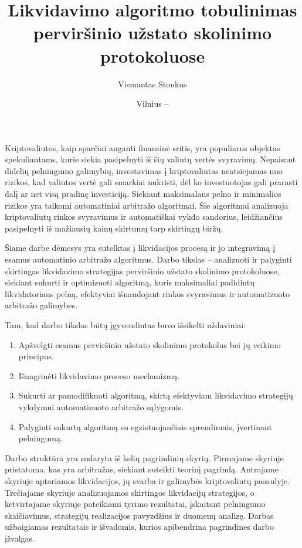 \documentclass{VUMIFPSkursinis}
\title{Likvidavimo algoritmo tobulinimas perviršinio užstato skolinimo protokoluose}
\author{Vismantas Stonkus}
\date{Vilnius – \the\year}
\begin{document}
\maketitle

\tableofcontents


Kriptovaliutos, kaip sparčiai auganti finansinė sritis, yra populiarus objektas spekuliantams, kurie siekia pasipelnyti iš šių valiutų vertės svyravimų. Nepaisant didelių pelningumo galimybių, investavimas į kriptovaliutas neatsiejamas nuo rizikos, kad valiutos vertė gali smarkiai nukristi, dėl ko investuotojas gali prarasti dalį ar net visą pradinę investiciją. Siekiant maksimalaus pelno ir minimalios rizikos yra taikomi automatiniai arbitražo algoritmai. Šie algoritmai analizuoja kriptovaliutų rinkos svyravimus ir automatiškai vykdo sandorius, leidžiančius pasipelnyti iš mažiausių kainų skirtumų tarp skirtingų biržų.

Šiame darbe dėmesys yra sutelktas į likvidacijos procesą ir jo integravimą į esamus automatinio arbitražo algoritmus. Darbo tikslas – analizuoti ir palyginti skirtingas likvidavimo strategijas perviršinio užstato skolinimo protokoluose, siekiant sukurti ir optimizuoti algoritmą, kuris maksimaliai padidintų likvidatoriaus pelną, efektyviai išnaudojant rinkos svyravimus ir automatizuoto arbitražo galimybes.

Tam, kad darbo tikslas būtų įgyvendintas buvo išsikelti uždaviniai:
\begin{enumerate}
    \item Apžvelgti esamus perviršinio užstato skolinimo protokolus bei jų veikimo principus.
    \item Išnagrinėti likvidavimo proceso mechanizmą.
    \item Sukurti ar pamodifikuoti algoritmą, skirtą efektyviam likvidavimo strategijų vykdymui automatizuoto arbitražo sąlygomis.
    \item Palyginti sukurtą algoritmą su egzistuojančiais sprendimais, įvertinant pelningumą.
\end{enumerate}

Darbo struktūra yra sudaryta iš kelių pagrindinių skyrių. Pirmajame skyriuje pristatoma, kas yra arbitražas, siekiant suteikti teorinį pagrindą. Antrajame skyriuje aptariamos likvidacijos, jų svarba ir galimybės kriptovaliutų pasaulyje. Trečiajame skyriuje analizuojamos skirtingos likvidacijų strategijos, o ketvirtajame skyriuje pateikiami tyrimo rezultatai, įskaitant pelningumo skaičiavimus, strategijų realizacijos pavyzdžius ir duomenų analizę. Darbas užbaigiamas rezultatais ir išvadomis, kurios apibendrina pagrindines darbo įžvalgas.
\end{document}
